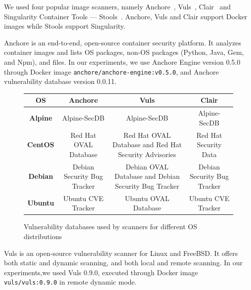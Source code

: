 \documentclass[a4paper,num-refs]{oup-contemporary}
\begin{document}
We used four popular image scanners, namely Anchore~\cite{github_2019},
Vuls~\cite{future-architect_2019}, Clair~\cite{arminc_2019} and
Singularity Container Tools --- Stools~\cite{stools}. Anchore, Vuls and Clair support Docker
images while Stools support Singularity. 

Anchore is an end-to-end, open-source container security platform. It
analyzes container images and lists OS
packages, non-OS packages (Python, Java, Gem, and Npm), and files.
In our experiments, we use Anchore Engine version 0.5.0 through Docker image \texttt{anchore/anchore-engine:v0.5.0}, and
Anchore vulnerability database version 0.0.11.

\begin{figure}
\begin{tabular}{|c|c|c|c|}
 \hline
\textbf{OS} &	\textbf{Anchore} &	\textbf{Vuls} &	\textbf{Clair} \\
\hline
	\textbf{Alpine} & Alpine-SecDB &	Alpine-SecDB &	Alpine-SecDB \\
\hline
	\textbf{CentOS} & Red Hat OVAL Database & Red Hat OVAL Database and Red Hat Security Advisories & Red Hat Security Data \\
\hline
	\textbf{Debian} & Debian Security Bug Tracker &	Debian OVAL Database and Debian Security Bug Tracker & Debian Security Bug Tracker \\
\hline
	\textbf{Ubuntu} & Ubuntu CVE Tracker &	Ubuntu OVAL Database &	Ubuntu CVE Tracker \\
 \hline
\end{tabular}
\caption{Vulnerability databases used by scanners for different OS distributions}
\label{database}
\end{figure}

Vuls is an open-source vulnerability scanner for Linux and FreeBSD. It
offers both static and dynamic scanning, and both local and remote
scanning. In our experiments,we used Vuls 0.9.0, executed through Docker image
\texttt{vuls/vuls:0.9.0} in remote dynamic mode.
\end{document}
